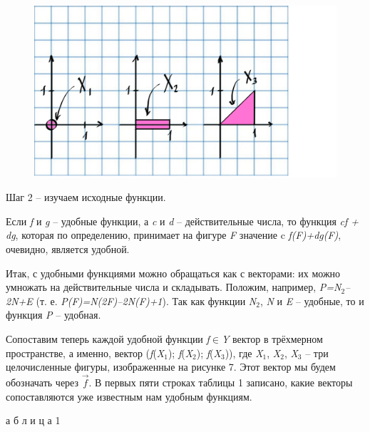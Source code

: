 \documentclass[main.tex]{subfiles}
\begin{document}
\begin{multicols}{2}


\begin{figure}[H]
\includegraphics[width=1.2\linewidth]{ris7.eps}
\end{figure}
\noindent\textcolor[rgb]{0.99,0.05,0.75}{Шаг 2 – изучаем исходные функции.}

Если \textit{f} и \textit{g} – удобные функции, а \textit{c} и \textit{d} – действительные числа, то функция \textit{cf + dg}, которая по определению, принимает на фигуре \textit{F} значение c \textit{f(F)+dg(F)}, очевидно, является удобной.

\begin{spacing}{1.7}
Итак, с удобными функциями можно обращаться как с векторами: их можно умножать на действительные числа и складывать. Положим, например, \textit{P=N}${_2}$\textit{–2N+E} (т. е. \textit{P(F)=N(2F)–2N(F)+1}). Так как функции \textit{N}${_2}$, \textit{N} и \textit{E} – удобные, то и функция \textit{P} – удобная.
\end{spacing}

Сопоставим теперь каждой удобной функции \textit{f}$\in$\textit{Y} вектор в трёхмерном пространстве, а именно, вектор (\textit{f}(\textit{X}${_1}$); \textit{f}(\textit{X}${_2}$); \textit{f}(\textit{X}${_3}$)), где \textit{X}${_1}$, \textit{X}${_2}$, \textit{X}${_3}$ – три целочисленные фигуры, изображенные на рисунке 7. Этот вектор мы будем обозначать через $\stackrel{\rightarrow}{\textit{f}}$. В первых пяти строках таблицы 1 записано, какие векторы сопоставляются уже известным нам удобным функциям.

 а б л и ц а  1


\end{multicols}
\end{document}
